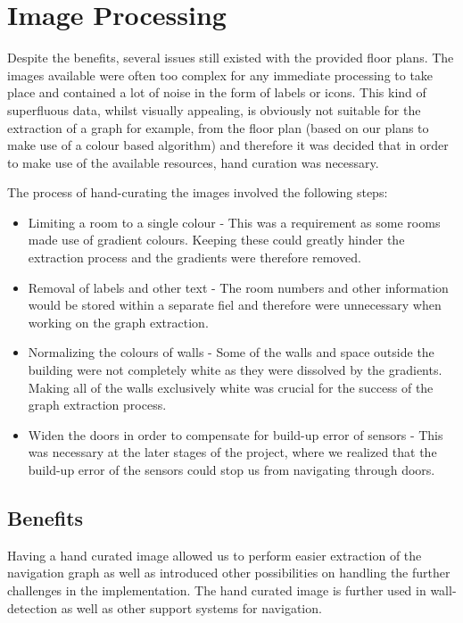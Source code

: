 \documentclass[main.tex]{subfiles}
\begin{document}
\section{Image Processing}

Despite the benefits, several issues still existed with the provided floor plans. The images available were often too complex for any immediate processing to take place and contained a lot of noise in the form of labels or icons. This kind of superfluous data, whilst visually appealing, is obviously not suitable for the extraction of a graph for example, from the floor plan (based on our plans to make use of a colour based algorithm) and therefore it was decided that in order to make use of the available resources, hand curation was necessary.

The process of hand-curating the images involved the following steps:

\begin{itemize}

\item Limiting a room to a single colour - This was a requirement as some rooms made use of gradient colours. Keeping these could greatly hinder the extraction process and the gradients were therefore removed.

\item Removal of labels and other text - The room numbers and other information would be stored within a separate fiel and therefore were unnecessary when working on the graph extraction.
			
\item Normalizing the colours of walls - Some of the walls and space outside the building were not completely white as they were dissolved by the gradients. Making all of the walls exclusively white was crucial for the success of the graph extraction process.
			
\item Widen the doors in order to compensate for build-up error of sensors - This was necessary at the later stages of the project, where we realized that the build-up error of the sensors could stop us from navigating through doors.
\end{itemize}
		
\subsection{Benefits}

Having a hand curated image allowed us to perform easier extraction of the navigation graph as well as introduced other possibilities on handling the further challenges in the implementation. The hand curated image is further used in wall-detection as well as other support systems for navigation. 
		
\end{document}
